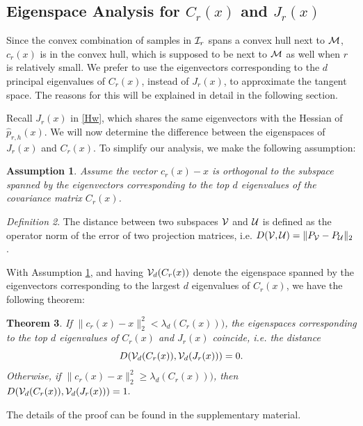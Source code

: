 \documentclass[aos,preprint]{imsart}
\newtheorem{theorem}{Theorem}[section]
\newtheorem{assumption}[theorem]{Assumption}
\theoremstyle{remark}
\newtheorem{definition}[theorem]{Definition}
\begin{document}
\subsection{Eigenspace Analysis for $C_r(x)$ and $J_r(x)$}


Since the convex combination of samples in ${\cal I}_r$ spans a convex hull next to $\cal M$, $c_r(x)$ is in the convex hull, which is supposed to be next to $\cal M$ as well when $r$ is relatively small.
We prefer to use the eigenvectors corresponding to the $d$ principal eigenvalues of $C_r(x)$, instead of $J_r(x)$, to approximate the tangent space. The reasons for this will be explained in detail in the following section.


Recall $J_r(x)$ in \eqref{Hw}, which shares the same eigenvectors with the Hessian of $\hat{p}_{r,h}(x)$. We will now determine the difference between the eigenspaces of $J_r(x)$ and $C_r(x)$. To simplify our analysis, we make the following assumption:
\begin{assumption}\label{assumption}
Assume the vector $c_r(x)-x$ is orthogonal to the subspace spanned by the eigenvectors corresponding to the top $d$ eigenvalues of the covariance matrix $C_r(x)$. %
\end{assumption}
\begin{definition}
The distance between two subspaces ${\cal V}$ and ${\cal U} $ is defined as the operator norm of the error of two projection matrices, i.e. $D({\cal V},{\cal U}) = \|P_{\cal V}-P_{\cal U}\|_2$.
\end{definition}

With Assumption \ref{assumption}, and having ${\cal V}_d (C_r(x))$ denote the eigenspace spanned by the eigenvectors corresponding to the largest $d$ eigenvalues of $C_r(x)$, we have the following theorem:
\begin{theorem}
If $\|c_r(x)-x\|_2^2< \lambda_d(C_r(x)))$, the eigenspaces corresponding to the top $d$ eigenvalues of $C_r(x)$ and $J_r(x)$ coincide, i.e. the distance 
\[
D({\cal V}_d (C_r(x)), {\cal V}_d (J_r(x)))=0.
\]
Otherwise, if $\|c_r(x)-x\|_2^2\geq \lambda_d(C_r(x)))$, then 
$
D({\cal V}_d (C_r(x)),{\cal V}_d (J_r(x)))=1.
$
\end{theorem}
The details of the proof can be found in the supplementary material.
\end{document}
